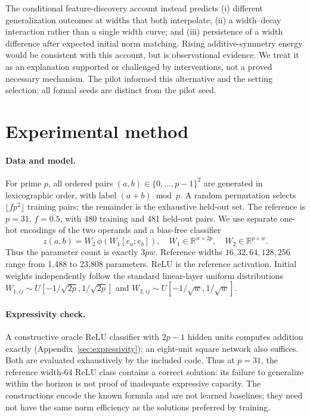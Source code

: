 \documentclass{article}
\begin{document}
The conditional feature-discovery account instead predicts (i) different generalization outcomes at widths that both interpolate; (ii) a width--decay interaction rather than a single width curve; and (iii) persistence of a width difference after expected initial norm matching. Rising additive-symmetry energy would be consistent with this account, but is observational evidence. We treat it as an explanation supported or challenged by interventions, not a proved necessary mechanism. The pilot informed this alternative and the setting selection; all formal seeds are distinct from the pilot seed.

\section{Experimental method}
\label{sec:method}
\paragraph{Data and model.}
For prime $p$, all ordered pairs $(a,b)\in\{0,\ldots,p-1\}^2$ are generated in lexicographic order, with label $(a+b)\bmod p$. A random permutation selects $\lfloor f p^2\rfloor$ training pairs; the remainder is the exhaustive held-out set. The reference is $p=31$, $f=0.5$, with 480 training and 481 held-out pairs. We use separate one-hot encodings of the two operands and a bias-free classifier
\begin{equation}
 z(a,b)=W_2\,\phi\!\left(W_1[e_a;e_b]\right),\quad
 W_1\in\mathbb R^{w\times 2p},\quad W_2\in\mathbb R^{p\times w}.
\end{equation}
Thus the parameter count is exactly $3pw$. Reference widths $16,32,64,128,256$ range from 1,488 to 23,808 parameters. ReLU is the reference activation. Initial weights independently follow the standard linear-layer uniform distributions $W_{1,ij}\sim U[-1/\sqrt{2p},1/\sqrt{2p}]$ and $W_{2,ij}\sim U[-1/\sqrt w,1/\sqrt w]$.

\paragraph{Expressivity check.}
A constructive oracle ReLU classifier with $2p-1$ hidden units computes addition exactly (Appendix~\ref{sec:expressivity}); an eight-unit square network also suffices. Both are evaluated exhaustively by the included code. Thus at $p=31$, the reference width-64 ReLU class contains a correct solution: its failure to generalize within the horizon is not proof of inadequate expressive capacity. The constructions encode the known formula and are not learned baselines; they need not have the same norm efficiency as the solutions preferred by training.
\end{document}

